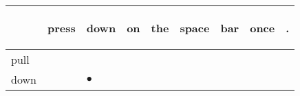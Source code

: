 \documentclass[landscape]{article}
\newcommand{\ssp}{\hspace{2pt}}
\newcommand{\mex}{\cellcolor{g}$\bullet$}
\begin{document}
\newpage

\noindent\begin{tabular}{|l|p{10pt}|p{10pt}|p{10pt}|p{10pt}|p{10pt}|p{10pt}|p{10pt}|p{10pt}|}
\hline
&\begin{sideways}\cellcolor{ref0}press\hspace{12pt}\end{sideways}&\begin{sideways}\cellcolor{ref1}down\hspace{12pt}\end{sideways}&\begin{sideways}\cellcolor{ref2}on\hspace{12pt}\end{sideways}&\begin{sideways}\cellcolor{ref3}the\hspace{12pt}\end{sideways}&\begin{sideways}\cellcolor{ref4}space\hspace{12pt}\end{sideways}&\begin{sideways}\cellcolor{ref5}bar\hspace{12pt}\end{sideways}&\begin{sideways}\cellcolor{ref6}once\hspace{12pt}\end{sideways}&\begin{sideways}\cellcolor{ref7}.\hspace{12pt}\end{sideways}\\
\hline
\ssp pull \ssp&\hspace{2pt}&\hspace{2pt}&\hspace{2pt}&\hspace{2pt}&\hspace{2pt}&\hspace{2pt}&\hspace{2pt}&\hspace{2pt}\\
\hline
\ssp \cellcolor{ref1}down \ssp&\hspace{2pt}&\hspace{2pt}\mex&\hspace{2pt}&\hspace{2pt}&\hspace{2pt}&\hspace{2pt}&\hspace{2pt}&\hspace{2pt}\\

\end{tabular}
\end{document}

